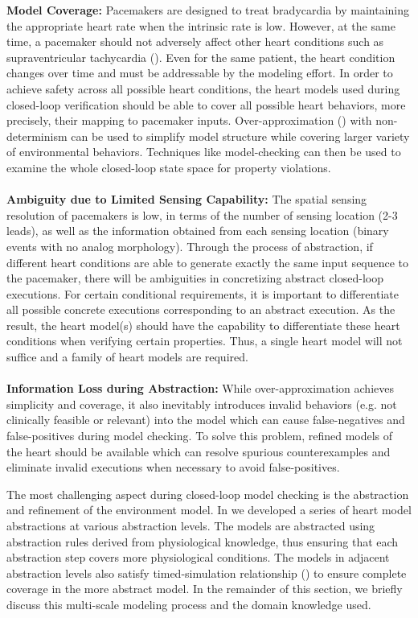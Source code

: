 \textbf{Model Coverage: } Pacemakers are designed to treat bradycardia by maintaining the appropriate heart rate when the intrinsic rate is low. However, at the same time, a pacemaker should not adversely affect other heart conditions such as supraventricular tachycardia (\cite{pacemakerrecalls}). Even for the same patient, the heart condition changes over time and must be addressable by the modeling effort. In order to achieve safety across all possible heart conditions, the heart models used during closed-loop verification should be able to cover all possible heart behaviors, more precisely, their mapping to pacemaker inputs. Over-approximation (\cite{CEGAR}) with non-determinism can be used to simplify model structure while covering larger variety of environmental behaviors. Techniques like model-checking can then be used to examine the whole closed-loop state space for property violations.\\\\ 
\textbf{Ambiguity due to Limited Sensing Capability: }The spatial sensing resolution of pacemakers is low, in terms of the number of sensing location (2-3 leads), as well as the information obtained from each sensing location (binary events with no analog morphology). Through the process of abstraction, if different heart conditions are able to generate exactly the same input sequence to the pacemaker, there will be ambiguities in concretizing abstract closed-loop executions. For certain conditional requirements, it is important to differentiate all possible concrete executions corresponding to an abstract execution. As the result, the heart model(s) should have the capability to differentiate these heart conditions when verifying certain properties. Thus, a single heart model will not suffice and a family of heart models are required.\\\\
\textbf{Information Loss during Abstraction: }While over-approximation achieves simplicity and coverage, it also inevitably introduces invalid behaviors (e.g. not clinically feasible or relevant) into the model which can cause false-negatives and false-positives during model checking. To solve this problem, refined models of the heart should be available which can resolve spurious counterexamples and eliminate invalid executions when necessary to avoid false-positives.

The most challenging aspect during closed-loop model checking is the abstraction and refinement of the environment model. In \cite{STTT13} we developed a series of heart model abstractions at various abstraction levels. The models are abstracted using abstraction rules derived from physiological knowledge, thus ensuring that each abstraction step covers more physiological conditions. The models in adjacent abstraction levels also satisfy \textsf{timed-simulation} relationship (\cite{simulation}) to ensure complete coverage in the more abstract model. In the remainder of this section, we briefly discuss this multi-scale modeling process and the domain knowledge used. 


